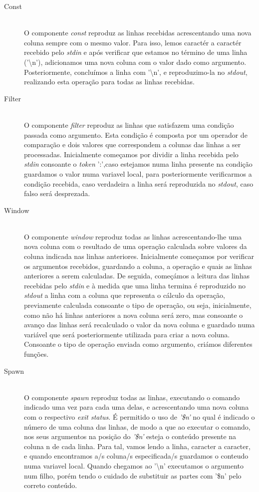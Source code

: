 \documentclass[12pt]{article}
\begin{document}
\begin{description} 
\item[Const] \hfill \\
O componente \textit{const} reproduz as linhas recebidas acrescentando uma nova coluna sempre com o mesmo valor. Para isso, lemos caractér a caractér recebido pelo \textit{stdin} e após verificar que estamos no término de uma linha ('\textbackslash n'), adicionamos uma nova coluna com o valor dado como argumento. Posteriormente, concluímos a linha com '\textbackslash n', e reproduzimo-la no \textit{stdout}, realizando esta operação para todas as linhas recebidas. 

\item[Filter] \hfill \\
O componente \textit{filter} reproduz as linhas que satisfazem uma condição passada como argumento. Esta condição é composta por um operador de comparação e dois valores que correspondem a colunas das linhas a ser processadas. Inicialmente começamos por dividir a linha recebida pelo \textit{stdin} consoante o \textit{token} ':',caso estejamos numa linha presente na condição guardamos o valor numa variavel local, para posteriormente verificarmos a condição recebida, caso verdadeira a linha será reproduzida no \textit{stdout}, caso falso será desprezada.

\item[Window] \hfill \\
O componente \textit{window} reproduz todas as linhas acrescentando-lhe uma nova coluna com o resultado de uma operação calculada sobre valores da coluna indicada nas linhas anteriores. Inicialmente começamos por verificar os argumentos recebidos, guardando a coluna, a operação e quais as linhas anteriores a serem calculadas. De seguida, começámos a leitura das linhas recebidas pelo \textit{stdin} e à medida que uma linha termina é reproduzido no \textit{stdout} a linha com a coluna que representa o cálculo da operação, previamente calculada consoante o tipo de operação, ou seja, inicialmente, como não há linhas anteriores a nova coluna será zero, mas consoante o avanço das linhas será recalculado o valor da nova coluna e guardado numa variável que será posteriormente utilizada para criar a nova coluna. Consoante o tipo de operação enviada como argumento, criámos diferentes funções.

\item[Spawn] \hfill \\
    O componente \textit{spawn} reproduz todas as linhas, executando o comando indicado uma vez para cada uma delas, e acrescentando uma nova coluna com o respectivo \textit{exit status}. É permitido o uso de \textit{'\$n'} no qual é indicado o número de uma coluna das linhas, de modo a que ao executar o comando, nos seus argumentos na posição do \textit{'\$n'} esteja o conteúdo presente na coluna n de cada linha. Para tal, vamos lendo a linha, caracter a caracter, e quando encontramos a/s coluna/s especificada/s guardamos o conteudo numa variavel local. Quando chegamos ao '\textbackslash n' executamos o argumento num filho, porém tendo o cuidado de substituir as partes com '\$n' pelo correto conteúdo.  

\end{description} 
\end{document}
